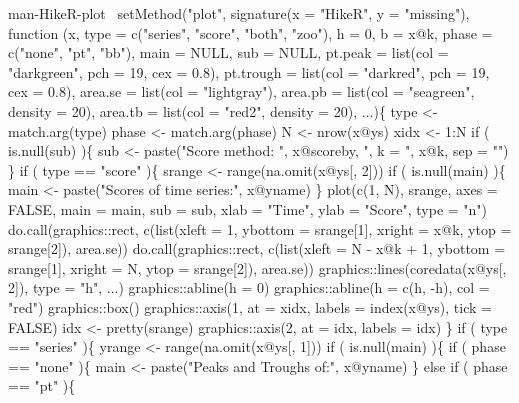 \documentclass[a4paper]{article}
\begin{document}
\nwenddocs{}\endmoddef
\LA{}man-HikeR-plot~{\nwtagstyle{}}\RA{}
setMethod("plot",
    signature(x = "HikeR", y = "missing"),
    function (x, type = c("series", "score", "both", "zoo"),
              h = 0, b = x@k, phase = c("none", "pt", "bb"),
              main = NULL, sub = NULL,
              pt.peak = list(col = "darkgreen", pch = 19, cex = 0.8),
              pt.trough = list(col = "darkred", pch = 19, cex = 0.8),
              area.se = list(col = "lightgray"),
              area.pb = list(col = "seagreen", density = 20),
              area.tb = list(col = "red2", density = 20),
              ...)\{
        type <- match.arg(type)
        phase <- match.arg(phase)
        N <- nrow(x@ys)
        xidx <- 1:N
        if ( is.null(sub) )\{
            sub <- paste("Score method: ", x@scoreby,
                         ", k = ", x@k, sep = "")
        \}
        if ( type == "score" )\{
            srange <- range(na.omit(x@ys[, 2]))
            if ( is.null(main) )\{
                main <- paste("Scores of time series:", x@yname)
            \}
            plot(c(1, N), srange, axes = FALSE,
                 main = main,
                 sub = sub,
                 xlab = "Time", ylab = "Score", type = "n")
            do.call(graphics::rect, c(list(xleft = 1,
                                           ybottom = srange[1],
                                           xright = x@k,
                                           ytop = srange[2]),
                                      area.se))
            do.call(graphics::rect, c(list(xleft = N - x@k + 1,
                                           ybottom = srange[1],
                                           xright = N,
                                           ytop = srange[2]),
                                      area.se))
            graphics::lines(coredata(x@ys[, 2]), type = "h", ...)
            graphics::abline(h = 0)
            graphics::abline(h = c(h, -h), col = "red")
            graphics::box()
            graphics::axis(1, at = xidx, labels = index(x@ys), tick = FALSE)
            idx <- pretty(srange)
            graphics::axis(2, at = idx, labels = idx)
        \}
        if ( type == "series" )\{
            yrange <- range(na.omit(x@ys[, 1]))
            if ( is.null(main) )\{
                if ( phase == "none" )\{
                    main <- paste("Peaks and Troughs of:", x@yname)
                \} else if ( phase == "pt" )\{
\end{document}
